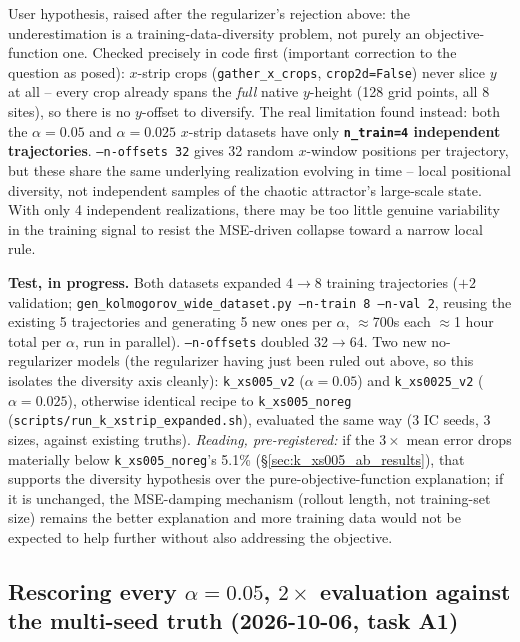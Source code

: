 \documentclass[11pt]{article}
\begin{document}
User hypothesis, raised after the regularizer's rejection above: the
underestimation is a training-data-diversity problem, not purely an
objective-function one. Checked precisely in code first (important
correction to the question as posed): $x$-strip crops
(\texttt{gather\_x\_crops}, \texttt{crop2d=False}) never slice $y$ at
all -- every crop already spans the \emph{full} native $y$-height (128
grid points, all 8 sites), so there is no $y$-offset to diversify. The
real limitation found instead: both the $\alpha{=}0.05$ and
$\alpha{=}0.025$ $x$-strip datasets have only \textbf{\texttt{n\_train=4}
independent trajectories}. \texttt{--n-offsets 32} gives 32 random
$x$-window positions per trajectory, but these share the same
underlying realization evolving in time -- local positional diversity,
not independent samples of the chaotic attractor's large-scale state.
With only 4 independent realizations, there may be too little genuine
variability in the training signal to resist the MSE-driven collapse
toward a narrow local rule.

\textbf{Test, in progress.} Both datasets expanded $4\to8$ training
trajectories ($+2$ validation; \texttt{gen\_kolmogorov\_wide\_dataset.py
--n-train 8 --n-val 2}, reusing the existing 5 trajectories and
generating 5 new ones per $\alpha$, $\approx$700s each $\approx$1 hour
total per $\alpha$, run in parallel). \texttt{--n-offsets} doubled
32$\to$64. Two new no-regularizer models (the regularizer having just
been ruled out above, so this isolates the diversity axis cleanly):
\texttt{k\_xs005\_v2} ($\alpha{=}0.05$) and \texttt{k\_xs0025\_v2}
($\alpha{=}0.025$), otherwise identical recipe to
\texttt{k\_xs005\_noreg} (\texttt{scripts/run\_k\_xstrip\_expanded.sh}),
evaluated the same way (3 IC seeds, 3 sizes, against existing truths).
\emph{Reading, pre-registered:} if the $3\times$ mean error drops
materially below \texttt{k\_xs005\_noreg}'s 5.1\%
(\S\ref{sec:k_xs005_ab_results}), that supports the diversity hypothesis
over the pure-objective-function explanation; if it is unchanged, the
MSE-damping mechanism (rollout length, not training-set size) remains
the better explanation and more training data would not be expected to
help further without also addressing the objective.

\subsection{Rescoring every $\alpha{=}0.05$, $2\times$ evaluation against
the multi-seed truth (2026-10-06, task A1)}
\label{sec:rescoring_2x}
\end{document}

